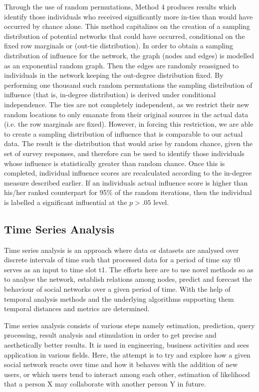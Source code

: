 Through the use of random permutations, Method 4 produces results which identify those individuals who received significantly more in-ties than would have occurred by chance alone. This method capitalizes on the creation of a sampling distribution of potential networks that could have occurred, conditional on the fixed row marginals or (out-tie distribution). In order to obtain a sampling distribution of influence for the network, the graph (nodes and edges) is modelled as an exponential random graph. Then the edges are randomly reassigned to individuals in the network keeping the out-degree distribution fixed. By performing one thousand such random permutations the sampling distribution of influence (that is, in-degree distribution) is derived under conditional independence. The ties are not completely independent, as we restrict their new random locations to only emanate from their original sources in the actual data (i.e. the row marginals are fixed). However, in forcing this restriction, we are able to create a sampling distribution of influence that is comparable to our actual data. The result is the distribution that would arise by random chance, given the set of survey responses, and therefore can be used to identify those individuals whose influence is statistically greater than random chance. Once this is completed, individual influence scores are recalculated according to the in-degree measure described earlier. If an individuals actual influence score is higher than his/her ranked counterpart for 95\% of the random iterations, then the individual is labelled a significant influential at the $p > .05$ level.

\subsection{Time Series Analysis}

Time series analysis is an approach where data or datasets are analysed over discrete intervals of time such that processed data for a period of time say t0 serves as an input to time slot t1. The efforts here are to use novel methods so as to analyse the network, establish relations among nodes, predict and forecast the behaviour of social networks over a given period of time. With the help of temporal analysis methods and the underlying algorithms supporting them temporal distances and metrics are determined. 

Time series analysis consists of various steps namely estimation, prediction, query processing, result analysis and stimulation in order to get precise and aesthetically better results. It is used in engineering, business activities and sees application in various fields. Here, the attempt is to try and explore how a given social network reacts over time and how it behaves with the addition of new users, or which users tend to interact among each other, estimation of likelihood that a person X may collaborate with another person Y in future.



